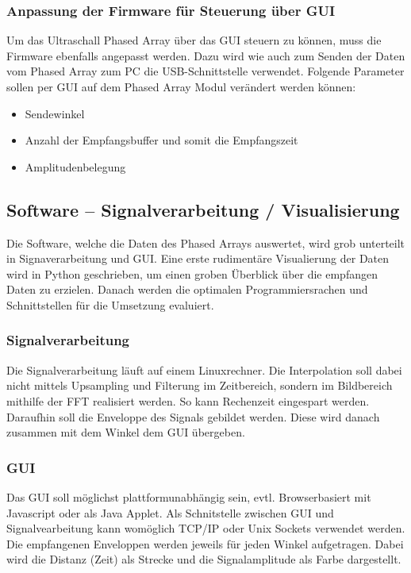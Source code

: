 \documentclass[10pt,a4paper,oneside]{99_fhnwreport}
\begin{document}
\subsubsection*{Anpassung der Firmware für Steuerung über GUI}
Um das Ultraschall Phased Array über das GUI steuern zu können, muss die Firmware ebenfalls angepasst werden. Dazu wird wie auch zum Senden der Daten vom Phased Array zum PC die USB-Schnittstelle verwendet. Folgende Parameter sollen per GUI auf dem Phased Array Modul verändert werden können:

\begin{itemize}
	\item Sendewinkel
	\item Anzahl der Empfangsbuffer und somit die Empfangszeit
	\item Amplitudenbelegung
\end{itemize}

\subsection*{Software -- Signalverarbeitung / Visualisierung}
Die Software, welche die Daten des Phased Arrays auswertet, wird grob unterteilt in Signaverarbeitung und GUI. Eine erste rudimentäre Visualierung der Daten wird in Python geschrieben, um einen groben Überblick über die empfangen Daten zu erzielen.
Danach werden die optimalen Programmiersrachen und Schnittstellen für die Umsetzung evaluiert.

\subsubsection*{Signalverarbeitung}
Die Signalverarbeitung läuft auf einem Linuxrechner. Die Interpolation soll dabei nicht mittels Upsampling und Filterung im Zeitbereich, sondern im Bildbereich mithilfe der FFT realisiert werden. So kann Rechenzeit eingespart werden. Daraufhin soll die Enveloppe des Signals gebildet werden.  Diese wird danach zusammen mit dem Winkel dem GUI übergeben.

\subsubsection*{GUI}
Das GUI soll möglichst plattformunabhängig sein, evtl. Browserbasiert mit Javascript oder als Java Applet. Als Schnitstelle zwischen GUI und Signalvearbeitung kann womöglich TCP/IP oder Unix Sockets verwendet werden.
Die empfangenen Enveloppen werden jeweils für jeden Winkel aufgetragen. Dabei wird die Distanz (Zeit) als Strecke und die Signalamplitude als Farbe dargestellt.
\end{document}
